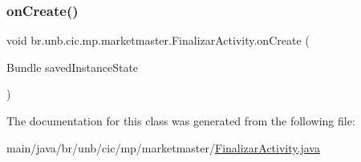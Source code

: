 \subsubsection{\texorpdfstring{on\+Create()}{onCreate()}}
{\footnotesize\ttfamily void br.\+unb.\+cic.\+mp.\+marketmaster.\+Finalizar\+Activity.\+on\+Create (\begin{DoxyParamCaption}\item[{Bundle}]{saved\+Instance\+State }\end{DoxyParamCaption})\hspace{0.3cm}{\ttfamily [protected]}}



The documentation for this class was generated from the following file\+:\begin{DoxyCompactItemize}
\item 
main/java/br/unb/cic/mp/marketmaster/\mbox{\hyperlink{FinalizarActivity_8java}{Finalizar\+Activity.\+java}}\end{DoxyCompactItemize}
